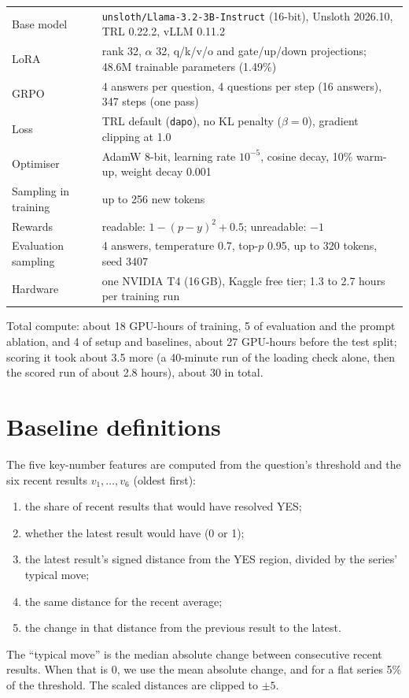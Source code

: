 \documentclass[11pt]{article}
\begin{document}
\begin{table}[H]
\centering\small
\begin{tabularx}{\linewidth}{lX}
\toprule
Base model & \texttt{unsloth/Llama-3.2-3B-Instruct} (16-bit), Unsloth 2026.10, TRL 0.22.2, vLLM 0.11.2 \\
LoRA & rank 32, $\alpha$ 32, q/k/v/o and gate/up/down projections; 48.6M trainable parameters (1.49\%) \\
GRPO & 4 answers per question, 4 questions per step (16 answers), 347 steps (one pass) \\
Loss & TRL default (\texttt{dapo}), no KL penalty ($\beta=0$), gradient clipping at 1.0 \\
Optimiser & AdamW 8-bit, learning rate $10^{-5}$, cosine decay, 10\% warm-up, weight decay 0.001 \\
Sampling in training & up to 256 new tokens \\
Rewards & readable: $1-(p-y)^2 + 0.5$; unreadable: $-1$ \\
Evaluation sampling & 4 answers, temperature 0.7, top-$p$ 0.95, up to 320 tokens, seed 3407 \\
Hardware & one NVIDIA T4 (16\,GB), Kaggle free tier; 1.3 to 2.7 hours per training run \\
\bottomrule
\end{tabularx}
\end{table}

Total compute: about 18 GPU-hours of training, 5 of evaluation and the prompt ablation, and 4 of setup and baselines, about 27 GPU-hours before the test split; scoring it took about 3.5 more (a 40-minute run of the loading check alone, then the scored run of about 2.8 hours), about 30 in total.

\section{Baseline definitions}
\label{app:baselines}

The five key-number features are computed from the question's threshold and the six recent results $v_1,\dots,v_6$ (oldest first):
\begin{enumerate}[leftmargin=*]
\item the share of recent results that would have resolved YES;
\item whether the latest result would have (0 or 1);
\item the latest result's signed distance from the YES region, divided by the series' typical move;
\item the same distance for the recent average;
\item the change in that distance from the previous result to the latest.
\end{enumerate}
The ``typical move'' is the median absolute change between consecutive recent results. When that is 0, we use the mean absolute change, and for a flat series 5\% of the threshold. The scaled distances are clipped to $\pm 5$.
\end{document}
